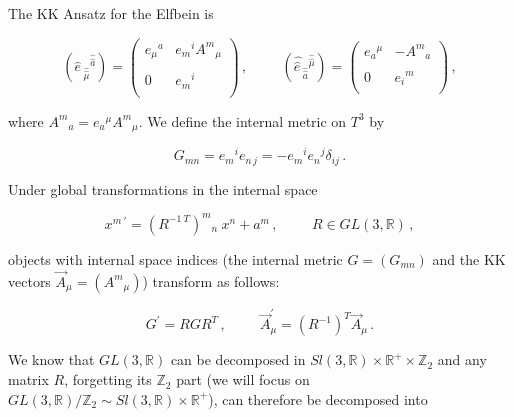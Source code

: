 \documentclass[12pt,a4paper]{article}
\begin{document}
\noindent The KK Ansatz for the Elfbein is

\begin{equation}
\left( \hat{\hat{e} \,}_{\hat{\hat{\mu}}}{}^{\hat{\hat{a}}} \right) = 
\left(
\begin{array}{cr}
e_{\mu}{}^{a} & e_{m}{}^{i}A^{m}{}_{\mu} \\
&\\
0             & e_{m}{}^{i}                \\
\end{array}
\right)
\, , 
\hspace{1cm}
\left(\hat{\hat{e} \,}_{\hat{\hat{a}}}{}^{\hat{\hat{\mu}}} \right) =
\left(
\begin{array}{cr}
e_{a}{}^{\mu} & -A^{m}{}_{a}   \\
& \\
0             &  e_{i}{}^{m}  \\
\end{array}
\right)\, , 
\label{eq:elfbein}
\end{equation}

\noindent where $A^{m}{}_{a}=e_{a}{}^{\mu}A^{m}{}_{\mu}$. We define the
internal metric on $T^{3}$ by

\begin{equation}
G_{mn}=e_{m}{}^{i}e_{n\, j}=-e_{m}{}^{i}e_{n}{}^{j}\delta_{ij}\, .
\end{equation}

\noindent Under global transformations in the internal space

\begin{equation}
x^{m\ \prime} = \left(R^{-1\ T}\right)^{m}{}_{n}\ x^{n} +a^{m}\, ,
\hspace{1cm}
R\in GL(3,\mathbb{R})\, ,
\end{equation}

\noindent objects with internal space indices 
(the internal metric $G=(G_{mn})$ and the KK vectors
$\vec{A}_{\mu}=(A^{m}{}_{\mu})$) transform as follows:

\begin{equation}
G^{\prime}= RGR^{T}\, ,  
\hspace{1cm}
\vec{A}^{\prime}_{\mu} = (R^{-1})^{T} \vec{A}_{\mu}\, .
\end{equation}

\noindent We know that $GL(3,\mathbb{R})$ can be decomposed in
$Sl(3,\mathbb{R})\times \mathbb{R}^{+}\times\mathbb{Z}_{2}$ and any
matrix $R$, forgetting its $\mathbb{Z}_{2}$ part
(we will focus on $GL(3,\mathbb{R})/\mathbb{Z}_{2}\sim
Sl(3,\mathbb{R})\times \mathbb{R}^{+}$), can therefore be
decomposed into
\end{document}
